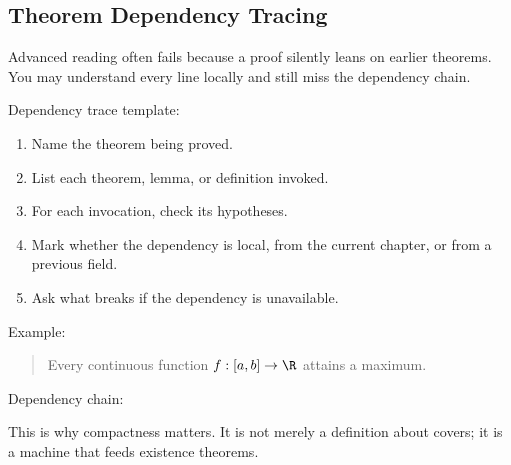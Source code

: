 \subsection{Theorem Dependency Tracing}

Advanced reading often fails because a proof silently leans on earlier theorems.
You may understand every line locally and still miss the dependency chain.

\begin{formalbox}
Dependency trace template:
\begin{enumerate}
\item Name the theorem being proved.
\item List each theorem, lemma, or definition invoked.
\item For each invocation, check its hypotheses.
\item Mark whether the dependency is local, from the current chapter, or from a previous field.
\item Ask what breaks if the dependency is unavailable.
\end{enumerate}
\end{formalbox}

Example:

\begin{quote}
Every continuous function $f:[a,b]\to\R$ attains a maximum.
\end{quote}

Dependency chain:

\begin{center}
\end{center}

This is why compactness matters. It is not merely a definition about covers; it
is a machine that feeds existence theorems.

